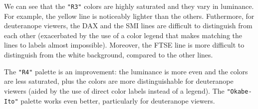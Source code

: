 We can see that the \texttt{"R3"} colors are highly saturated and they vary in
luminance. For example, the yellow line is noticeably lighter than the others.
Futhermore, for deuteranope viewers, the DAX and the SMI lines are difficult to
distinguish from each other (exacerbated by the use of a color legend that makes
matching the lines to labels almost impossible). Moreover, the FTSE line is more
difficult to distinguish from the white background, compared to the other lines.

The \texttt{"R4"} palette is an improvement: the luminance is more even and
the colors are less saturated, plus the colors are more distinguishable for
deuteranope viewers (aided by the use of direct color labels instead of a legend).
The \texttt{"Okabe-Ito"} palette works even better, particularly for deuteranope viewers.

